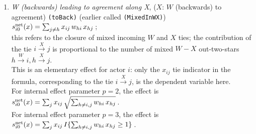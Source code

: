 \documentclass[a4paper,fleqn,11pt]{article}
\newcommand{\+}{\, + \,}
\newcommand{\vit}{\theenumi}
\begin{document}
\begin{enumerate}
 \item
\begin{minipage}[t]{.7\textwidth}
{\em  W (backwards) leading to agreement along X}, ($X$: $W$ (backwards) to agreement) \texttt{(toBack)}
 (earlier called \texttt{(MixedInWX)}) \\[0.2em]
 $s^{\rm net}_{i\vit}(x) = \sum_{j \neq h} x_{ij}\, w_{hi}\, x_{hj}\,$;\\[0.2em]
 this refers to the closure of mixed incoming $W$ and $X$ ties;
 the contribution of the tie $i \stackrel{X}{\rightarrow} j$
 is proportional to
 the number of mixed $W-X$ out-two-stars
 $h \stackrel{W}{\rightarrow} i,  h \stackrel{X}{\rightarrow} j$.\\
 This is an elementary effect for actor $i$:
 only the $x_{ij}$ tie indicator in the formula,
 corresponding to  the tie $i \stackrel{X}{\rightarrow} j$,
 is the dependent variable here.\\
 For internal effect parameter $p = 2$, the effect is  \\[0.2em]
 $s^{\rm net}_{i\vit}(x) = \sum_j x_{ij}\, \sqrt{ \sum_{h \neq i, j} w_{hi}\, x_{hj}}\,$.\\
  For internal effect parameter $p = 3$, the effect is  \\[0.2em]
 $s^{\rm net}_{i\vit}(x) = \sum_j x_{ij}\, I\{ \sum_{h \neq i, j} w_{hi}\, x_{hj} \geq 1\}\,$.


\end{minipage}
\end{enumerate}
\end{document}
